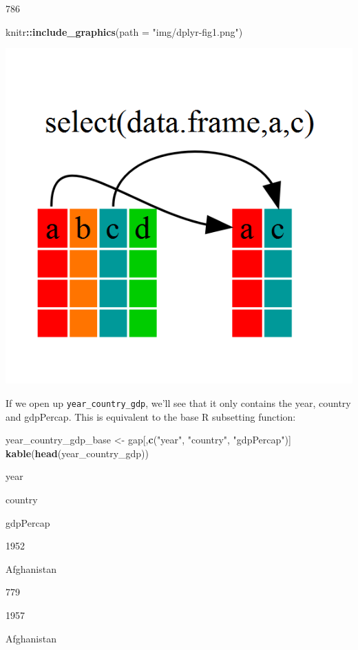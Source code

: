 \documentclass[]{book}
\newenvironment{Shaded}{\begin{snugshade}}{\end{snugshade}}
\newcommand{\KeywordTok}[1]{\textcolor[rgb]{0.13,0.29,0.53}{\textbf{#1}}}
\newcommand{\DataTypeTok}[1]{\textcolor[rgb]{0.13,0.29,0.53}{#1}}
\newcommand{\StringTok}[1]{\textcolor[rgb]{0.31,0.60,0.02}{#1}}
\newcommand{\OperatorTok}[1]{\textcolor[rgb]{0.81,0.36,0.00}{\textbf{#1}}}
\newcommand{\NormalTok}[1]{#1}
\begin{document}
786

\begin{Shaded}
\begin{Highlighting}[]
\NormalTok{knitr}\OperatorTok{::}\KeywordTok{include_graphics}\NormalTok{(}\DataTypeTok{path =} \StringTok{"img/dplyr-fig1.png"}\NormalTok{)}
\end{Highlighting}
\end{Shaded}

\begin{center}\includegraphics[width=0.7\linewidth]{img/dplyr-fig1} \end{center}

If we open up \texttt{year\_country\_gdp}, we'll see that it only
contains the year, country and gdpPercap. This is equivalent to the base
R subsetting function:

\begin{Shaded}
\begin{Highlighting}[]
\NormalTok{year_country_gdp_base <-}\StringTok{ }\NormalTok{gap[,}\KeywordTok{c}\NormalTok{(}\StringTok{"year"}\NormalTok{, }\StringTok{"country"}\NormalTok{, }\StringTok{"gdpPercap"}\NormalTok{)]}
\KeywordTok{kable}\NormalTok{(}\KeywordTok{head}\NormalTok{(year_country_gdp))}
\end{Highlighting}
\end{Shaded}

year

country

gdpPercap

1952

Afghanistan

779

1957

Afghanistan
\end{document}

